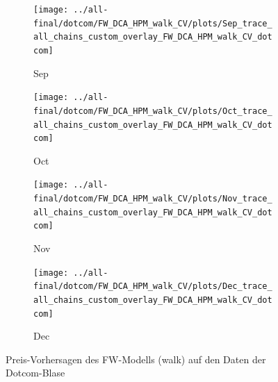 \documentclass[ngerman]{ttlab-qualify}
\begin{document}
\begin{figure}[H]
\begin{subfigure}{.3\linewidth}
  \texttt{[image: ../all-final/dotcom/FW\_DCA\_HPM\_walk\_CV/plots/Sep\_trace\_all\_chains\_custom\_overlay\_FW\_DCA\_HPM\_walk\_CV\_dotcom]}\hfill
  \caption{Sep}
  \end{subfigure}\par\medskip
  \begin{subfigure}{.3\linewidth}
  \texttt{[image: ../all-final/dotcom/FW\_DCA\_HPM\_walk\_CV/plots/Oct\_trace\_all\_chains\_custom\_overlay\_FW\_DCA\_HPM\_walk\_CV\_dotcom]}\hfill
  \caption{Oct}
  \end{subfigure}
  \begin{subfigure}{.3\linewidth}
  \texttt{[image: ../all-final/dotcom/FW\_DCA\_HPM\_walk\_CV/plots/Nov\_trace\_all\_chains\_custom\_overlay\_FW\_DCA\_HPM\_walk\_CV\_dotcom]}\hfill
  \caption{Nov}
  \end{subfigure}
  \begin{subfigure}{.3\linewidth}
  \texttt{[image: ../all-final/dotcom/FW\_DCA\_HPM\_walk\_CV/plots/Dec\_trace\_all\_chains\_custom\_overlay\_FW\_DCA\_HPM\_walk\_CV\_dotcom]}\hfill
  \caption{Dec}
  \end{subfigure}
  \caption{Preis-Vorhersagen des FW-Modells (walk) auf den Daten der Dotcom-Blase}
\end{figure}
\end{document}
